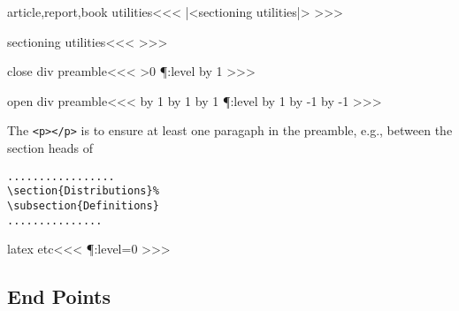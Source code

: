 {\<article,report,book utilities\><<<
|<sectioning utilities|>
>>>

\<sectioning utilities\><<<
\HAssign{}
\HAssign{}
\def\OpenDiv#1{%
   \IgnorePar\EndP \PopStack\text:stack\:temp \def\:tempa{body}%
   \ifx \:temp\:tempa \else \HCode{</\:temp><body>}\fi
   \PushStack\text:stack{body}%
   |<close div preamble|>%
   \gHAdvance\DivLevel by 1
   \HCode{<!--l. \the\inputlineno--><div\Hnewline
       type="#1">}\gHAdvance\P:level by 1 }
\def\CloseDiv#1{%
   \IgnorePar\EndP \gHAdvance\P:level by -1 \HCode{</div><!--end #1-->}%
   \gHAdvance\DivLevel by -1
}
\def\CloseHead{\HCode{</head>}%
   |<open div preamble|>\ShowPar\par}
>>>


\<close div preamble\><<<
\ifnum \DivLevel>0  \ifnum {}\relax
   \gHAdvance\P:level by 1 
\fi\fi
>>>

\<open div preamble\><<<
\gHAdvance\DivCount by 1
%
\HAdvance\DivLevel by 1
\HAdvance\DivCount by 1
\ifnum {}\relax
   \gHAdvance\P:level by 1 
\fi
\HAdvance\DivLevel by -1
\HAdvance\DivCount by -1
>>>


The \verb+<p></p>+ is to ensure at least one paragaph in the preamble, e.g.,
between the section heads of
\begin{verbatim}
.................
\section{Distributions}%
\subsection{Definitions}
...............
\end{verbatim}


\<latex etc\><<<
\gHAssign\P:level=0 
>>>













\subsection{End Points}

}
